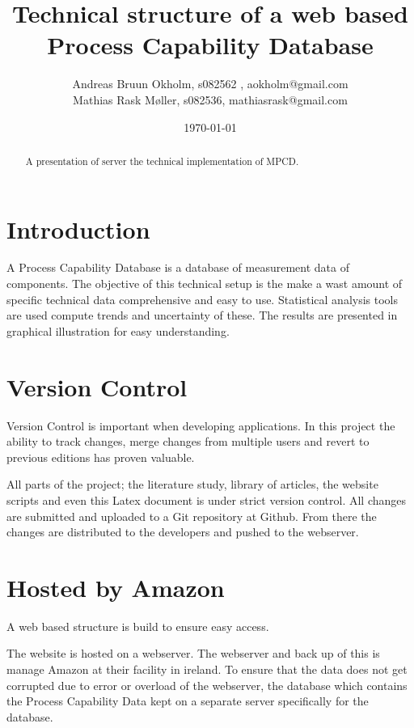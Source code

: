 \documentclass[aip,amsmath,reprint, author-year]{revtex4-1}
\begin{document}
\begin{abstract}
A presentation of server the technical implementation of MPCD.
\end{abstract}

\title{Technical structure of a web based Process Capability Database }
\author{Andreas Bruun Okholm, s082562 , aokholm@gmail.com\\
Mathias Rask Møller, s082536, mathiasrask@gmail.com }
 
\date{\today}
\maketitle


\section{Introduction}
A Process Capability Database is a database of measurement data of components. The objective of this technical setup is the make a wast amount of specific technical data comprehensive and easy to use. Statistical analysis tools are used compute trends and uncertainty of these. The results are presented in graphical illustration for easy understanding.

\section{Version Control}
Version Control is important when developing applications. In this project the ability to track changes, merge changes from multiple users and revert to previous editions has proven valuable.

All parts of the project; the literature study, library of articles, the website scripts and even this Latex document is under strict version control. 
All changes are submitted and uploaded to a Git repository at Github. From there the changes are distributed to the developers and pushed to the webserver. 

\section{Hosted by Amazon}
A web based structure is build to ensure easy access. 

The website is hosted on a webserver. The webserver and back up of this is manage Amazon at their facility in ireland. To ensure that the data does not get corrupted due to error or overload of the webserver, the database which contains the Process Capability Data kept on a separate server specifically for the database. 
\end{document}
